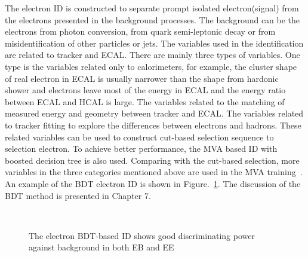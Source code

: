 The electron ID is constructed to separate prompt isolated electron(signal) from the electrons presented in the background processes. The background can be the electrons from photon conversion, from quark semi-leptonic decay or from misidentification of other particles or jets. The variables used in the identification are related to tracker and ECAL.  There are mainly three types of variables. One type is the variables related only to calorimeters, for example, the cluster shape of real electron in ECAL is usually narrower than the shape from hardonic shower and electrons leave most of the energy in ECAL and the energy ratio between ECAL and HCAL is large. The variables related to the matching of measured energy and geometry between tracker and ECAL. The variables related to tracker fitting to explore the differences between electrons and hadrons. These related variables can be used to construct cut-based selection sequence to selection electron. To achieve better performance, the MVA based ID with boosted decision tree is also used. Comparing with the cut-based selection, more variables in the three categories mentioned above are used in the MVA training~\cite{electron_reco2015}.  An example of the BDT electron ID is shown in Figure.~\ref{fig:eleBDTID}. The discussion of the BDT method is presented in Chapter 7.


\begin{figure}[!htbp] 
     \centering
     \\
     \caption[The electron BDT-based ID shows good discriminating power against background in both EB and EE]{The electron BDT-based ID shows good discriminating power against background in both EB and EE~\cite{electron_reco2015}}
     \label{fig:eleBDTID}
\end{figure}


